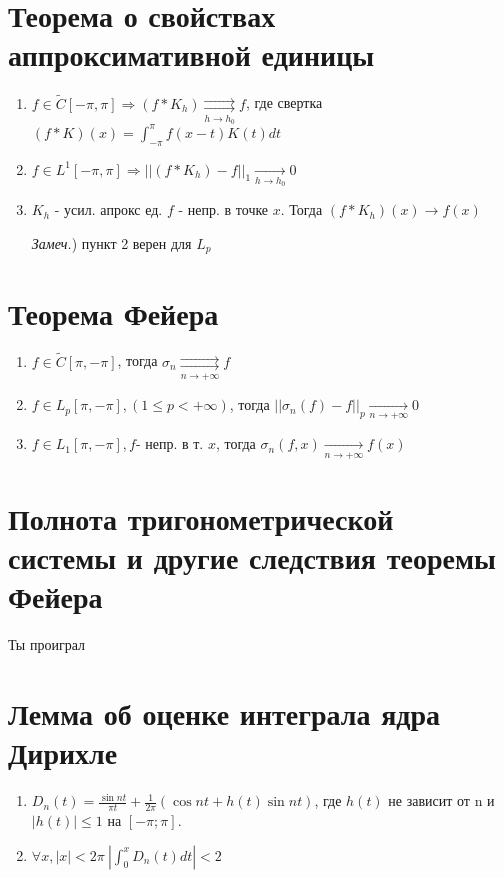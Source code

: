     \section{Теорема о свойствах аппроксимативной единицы}
    \begin{enumerate}
        \item $f \in \widetilde{C}[-\pi, \pi] \Rightarrow (f * K_h) \underset{h \rightarrow h_0}{\rightrightarrows} f $, где
        свертка $(f* K)(x) = \int_{-\pi}^{\pi} f(x-t)K(t)dt$
        
        \item $f \in L^1 [-\pi, \pi] \Rightarrow ||(f * K_h) - f||_1 \underset{h \rightarrow h_0}{\rightarrow} 0 $
        \item $K_h$ - усил. апрокс ед. $f$ - непр. в точке $x$. Тогда $(f * K_h)(x) \rightarrow f(x)$

        \emph{Замеч.}) пункт 2 верен для $ L_p $
    \end{enumerate}

    \section{Теорема Фейера}
        \begin{enumerate}
            \item $ f \in \widetilde{C}[\pi, -\pi] $, тогда $ \sigma_n \underset{n \rightarrow +\infty}{\rightrightarrows} f$

            \item $ f \in L_p[\pi, -\pi], (1 \leq p < +\infty)$, тогда $ ||\sigma_n(f) - f||_p \underset{n \rightarrow +\infty}{\rightarrow} 0 $

            \item $ f \in L_1[\pi, -\pi], f $- непр. в т. $x$, тогда $ \sigma_n(f, x) \underset{n \rightarrow +\infty}{\rightarrow} f(x) $
        \end{enumerate}

    \section{Полнота тригонометрической системы и другие следствия теоремы Фейера}
    Ты проиграл

    \section{Лемма об оценке интеграла ядра Дирихле}
    \begin{enumerate}
        \item $D_n(t) = \frac{\sin nt}{\pi t} + \frac{1}{2\pi}(\cos nt + h(t)\sin nt)$, где $h(t)$ не зависит от n и $|h(t)| \leq 1$
            на $[-\pi;\pi]$.
        \item $\forall x, |x| < 2\pi\ |\int_0^x D_n(t) dt| < 2$
    \end{enumerate}
